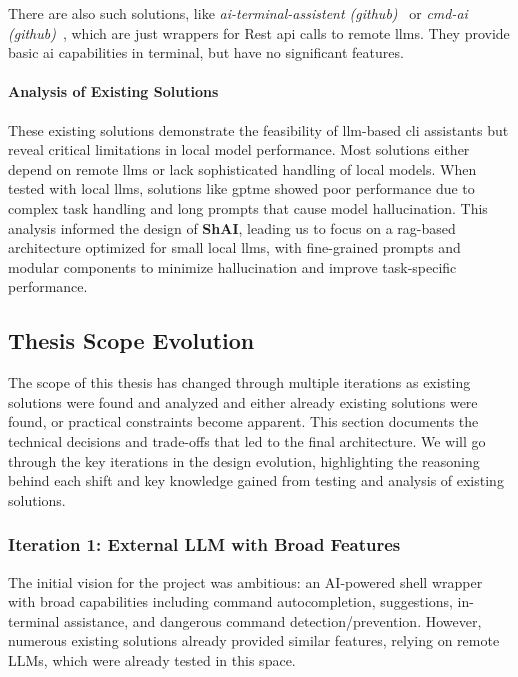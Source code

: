 There are also such solutions, like \textsl{ai-terminal-assistent
(github)}~\cite{aiterminala} or \textsl{cmd-ai (github)}~\cite{cmdai}, which are
just wrappers for Rest \gls{api} calls to remote \glspl{llm}. They provide basic
\gls{ai} capabilities in terminal, but have no significant features.

\paragraph{Analysis of Existing Solutions}

These existing solutions demonstrate the feasibility of \gls{llm}-based \gls{cli}
assistants but reveal critical limitations in local model performance. Most solutions
either depend on remote \glspl{llm} or lack sophisticated handling of local models.
When tested with local \glspl{llm}, solutions like gptme showed poor performance due to
complex task handling and long prompts that cause model hallucination. This analysis
informed the design of \textbf{ShAI}, leading us to focus on a \gls{rag}-based architecture
optimized for small local \glspl{llm}, with fine-grained prompts and modular components
to minimize hallucination and improve task-specific performance.

\subsection{Thesis Scope Evolution}\label{sec:design-evolution}

The scope of this thesis has changed through multiple iterations as existing
solutions were found and analyzed and either already existing solutions were
found, or practical constraints become apparent. This section documents the
technical decisions and trade-offs that led to the final architecture. We will
go through the key iterations in the design evolution, highlighting the
reasoning behind each shift and key knowledge gained from testing and analysis
of existing solutions.

\subsubsection{Iteration 1: External LLM with Broad Features}
The initial vision for the project was ambitious: an AI-powered shell
wrapper with
broad capabilities including command autocompletion, suggestions, in-terminal
assistance, and dangerous command detection/prevention. However, numerous
existing solutions %
already provided similar features, relying on remote LLMs,
which were already tested in this space.
